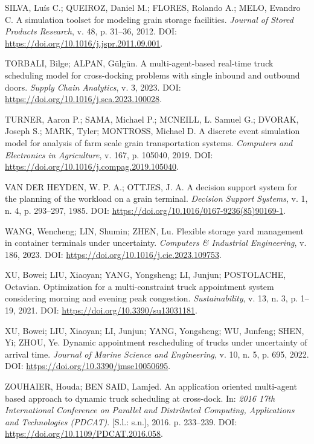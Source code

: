 \documentclass[
  12pt,
  oneside,
  a4paper,
  sumario=tradicional,
  brazil
]{abntex2}
\begin{document}
SILVA, Lu\'is C.; QUEIROZ, Daniel M.; FLORES, Rolando A.; MELO, Evandro C. A simulation toolset for modeling grain storage facilities. \textit{Journal of Stored Products Research}, v. 48, p. 31--36, 2012. DOI: \url{https://doi.org/10.1016/j.jspr.2011.09.001}.

TORBALI, Bilge; ALPAN, G\"ulg\"un. A multi-agent-based real-time truck scheduling model for cross-docking problems with single inbound and outbound doors. \textit{Supply Chain Analytics}, v. 3, 2023. DOI: \url{https://doi.org/10.1016/j.sca.2023.100028}.

TURNER, Aaron P.; SAMA, Michael P.; MCNEILL, L. Samuel G.; DVORAK, Joseph S.; MARK, Tyler; MONTROSS, Michael D. A discrete event simulation model for analysis of farm scale grain transportation systems. \textit{Computers and Electronics in Agriculture}, v. 167, p. 105040, 2019. DOI: \url{https://doi.org/10.1016/j.compag.2019.105040}.

VAN DER HEYDEN, W. P. A.; OTTJES, J. A. A decision support system for the planning of the workload on a grain terminal. \textit{Decision Support Systems}, v. 1, n. 4, p. 293--297, 1985. DOI: \url{https://doi.org/10.1016/0167-9236(85)90169-1}.

WANG, Wencheng; LIN, Shumin; ZHEN, Lu. Flexible storage yard management in container terminals under uncertainty. \textit{Computers \& Industrial Engineering}, v. 186, 2023. DOI: \url{https://doi.org/10.1016/j.cie.2023.109753}.

XU, Bowei; LIU, Xiaoyan; YANG, Yongsheng; LI, Junjun; POSTOLACHE, Octavian. Optimization for a multi-constraint truck appointment system considering morning and evening peak congestion. \textit{Sustainability}, v. 13, n. 3, p. 1--19, 2021. DOI: \url{https://doi.org/10.3390/su13031181}.

XU, Bowei; LIU, Xiaoyan; LI, Junjun; YANG, Yongsheng; WU, Junfeng; SHEN, Yi; ZHOU, Ye. Dynamic appointment rescheduling of trucks under uncertainty of arrival time. \textit{Journal of Marine Science and Engineering}, v. 10, n. 5, p. 695, 2022. DOI: \url{https://doi.org/10.3390/jmse10050695}.

ZOUHAIER, Houda; BEN SAID, Lamjed. An application oriented multi-agent based approach to dynamic truck scheduling at cross-dock. In: \textit{2016 17th International Conference on Parallel and Distributed Computing, Applications and Technologies (PDCAT)}. [S.l.: s.n.], 2016. p. 233--239. DOI: \url{https://doi.org/10.1109/PDCAT.2016.058}.

\endgroup
\end{document}
